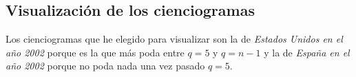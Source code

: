 \documentclass[10pt,a4paper,spanish]{article}
\numberwithin{equation}{section} %
\numberwithin{figure}{section} %
\numberwithin{table}{section} %
\begin{document}
\subsection{Visualización de los cienciogramas}

Los cienciogramas que he elegido para visualizar son la de \textit{Estados Unidos en el año 2002} porque es la que más poda entre $q = 5$ y $q = n-1$ y la de \textit{España en el año 2002} porque no poda nada una vez pasado $q = 5$.

\begin{figure}[!h]
    \centering
    \mbox{
    }
    \mbox{
        }
\end{figure}
\end{document}
